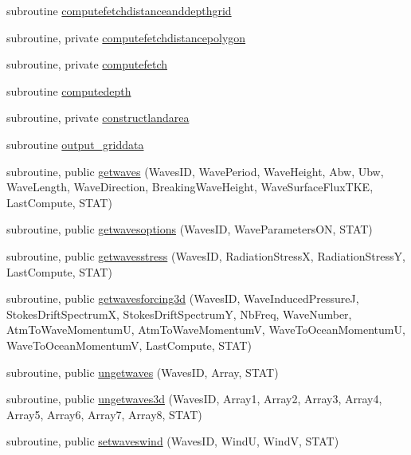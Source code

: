 \begin{DoxyCompactItemize}
subroutine \mbox{\hyperlink{namespacemodulewaves_a885bbbf547ce705b1cd35ecfebe8df37}{computefetchdistanceanddepthgrid}}
\item 
subroutine, private \mbox{\hyperlink{namespacemodulewaves_aae4352dfe2bb084d6d5d956c1bdadea3}{computefetchdistancepolygon}}
\item 
subroutine, private \mbox{\hyperlink{namespacemodulewaves_a1ef67144876afbf33cc3bff9a3c88ebd}{computefetch}}
\item 
subroutine \mbox{\hyperlink{namespacemodulewaves_a27cdbb0680c11412da65be9051fe9100}{computedepth}}
\item 
subroutine, private \mbox{\hyperlink{namespacemodulewaves_a509d19a4e531573684282a3b2e47fb4a}{constructlandarea}}
\item 
subroutine \mbox{\hyperlink{namespacemodulewaves_a566d06de3bff651d00d4a28e0e06157b}{output\+\_\+griddata}}
\item 
subroutine, public \mbox{\hyperlink{namespacemodulewaves_a12875a6c82df32faa0d9a05dd2d67b1e}{getwaves}} (Waves\+ID, Wave\+Period, Wave\+Height, Abw, Ubw, Wave\+Length, Wave\+Direction, Breaking\+Wave\+Height, Wave\+Surface\+Flux\+T\+KE, Last\+Compute, S\+T\+AT)
\item 
subroutine, public \mbox{\hyperlink{namespacemodulewaves_af1623a677ea698d686e5a5faa283eea1}{getwavesoptions}} (Waves\+ID, Wave\+Parameters\+ON, S\+T\+AT)
\item 
subroutine, public \mbox{\hyperlink{namespacemodulewaves_a0fa381ad7f743e71a910cb5aafaea3c4}{getwavesstress}} (Waves\+ID, Radiation\+StressX, Radiation\+StressY, Last\+Compute, S\+T\+AT)
\item 
subroutine, public \mbox{\hyperlink{namespacemodulewaves_a53569d674a6deea3e1da241680a758b3}{getwavesforcing3d}} (Waves\+ID, Wave\+Induced\+PressureJ, Stokes\+Drift\+SpectrumX, Stokes\+Drift\+SpectrumY, Nb\+Freq, Wave\+Number, Atm\+To\+Wave\+MomentumU, Atm\+To\+Wave\+MomentumV, Wave\+To\+Ocean\+MomentumU, Wave\+To\+Ocean\+MomentumV, Last\+Compute, S\+T\+AT)
\item 
subroutine, public \mbox{\hyperlink{namespacemodulewaves_a0c5557cca037fc7fe0c05098f278075d}{ungetwaves}} (Waves\+ID, Array, S\+T\+AT)
\item 
subroutine, public \mbox{\hyperlink{namespacemodulewaves_a889d8243c00922f75bfc878e13f4990d}{ungetwaves3d}} (Waves\+ID, Array1, Array2, Array3, Array4, Array5, Array6, Array7, Array8, S\+T\+AT)
\item 
subroutine, public \mbox{\hyperlink{namespacemodulewaves_a58822c6f40408298926b3e3778be3adc}{setwaveswind}} (Waves\+ID, WindU, WindV, S\+T\+AT)

\end{DoxyCompactItemize}
